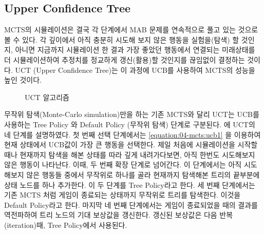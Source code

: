 \documentclass[letterpaper,10pt,english]{sphinxmanual}
\begin{document}
\subsection{Upper Confidence Tree}
\label{\detokenize{04-mcts:upper-confidence-tree}}
MCTS의 시뮬레이션은 결국 각 단계에서 MAB 문제를 연속적으로 풀고 있는 것으로 볼 수 있다.
각 깊이에서 아직 충분히 시도해 보지 않은 행동을 실험을(탐색) 할 것인지, 아니면 지금까지 시뮬레이션 한 결과 가장 좋았던
행동에서 연결되는 미래상태를 더 시뮬레이션하여 추정치를 정교하게 갱신(활용)할 것인지를 끊임없이 결정하는 것이다.
UCT (Upper Confidence Tree)는 이 과정에 UCB를 사용하여 MCTS의 성능을 높인 것이다.

\begin{figure}[htbp]
\centering
\capstart

\noindent{}
\caption{UCT 알고리즘}\label{\detokenize{04-mcts:uct-algorithm}}\label{\detokenize{04-mcts:id8}}\end{figure}

무작위 탐색(Monte-Carlo simulation)만을 하는 기존 MCTS와 달리 UCT는 UCB를 사용하는 Tree Policy 와
Default Policy (무작위 탐색) 단계로 구분된다. {\hyperref[\detokenize{04-mcts:uct-algorithm}]{}} 에 UCT의 네 단계를 설명하였다.
첫 번째 선택 단계에서는 \eqref{equation:04-mcts:ucb1} 을 이용하여 현재 상태에서 UCB값이 가장 큰 행동을 선택한다.
제일 처음에 시뮬레이션을 시작할 때나 현재까지 탐색을 해본 상태를 따라 깊게 내려가다보면,
아직 한번도 시도해보지 않은 행동이 나타난다.
이때, 두 번째 확장 단계로 넘어간다. 이 단계에서는 아직 시도해보지 않은 행동들 중에서 무작위로 하나를 골라
현재까지 탐색해본 트리의 끝부분에 상태 노드를 하나 추가한다. 이 두 단계를 Tree Policy라고 한다.
세 번째 단계에서는 기존 MCTS 처럼 게임이 종료되는 상태까지 무작위로 트리를 탐색한다. 이것을 Default Policy라고 한다.
마지막 네 번째 단계에서는 게임이 종료되었을 때의 결과를 역전파하여 트리 노드의 기대 보상값을 갱신한다.
갱신된 보상값은 다음 반복(iteration)때, Tree Policy에서 사용된다.
\end{document}
